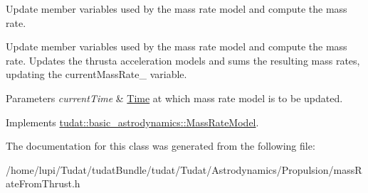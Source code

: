 Update member variables used by the mass rate model and compute the mass rate. 

Update member variables used by the mass rate model and compute the mass rate. Updates the thrusta acceleration models and sums the resulting mass rates, updating the current\+Mass\+Rate\+\_\+ variable. 
\begin{DoxyParams}{Parameters}
{\em current\+Time} & \hyperlink{classtudat_1_1Time}{Time} at which mass rate model is to be updated. \\
\hline
\end{DoxyParams}


Implements \hyperlink{classtudat_1_1basic__astrodynamics_1_1MassRateModel_a73c723ea252c57f3ac3109bb4c1bed42}{tudat\+::basic\+\_\+astrodynamics\+::\+Mass\+Rate\+Model}.



The documentation for this class was generated from the following file\+:\begin{DoxyCompactItemize}
\item 
/home/lupi/\+Tudat/tudat\+Bundle/tudat/\+Tudat/\+Astrodynamics/\+Propulsion/mass\+Rate\+From\+Thrust.\+h\end{DoxyCompactItemize}
